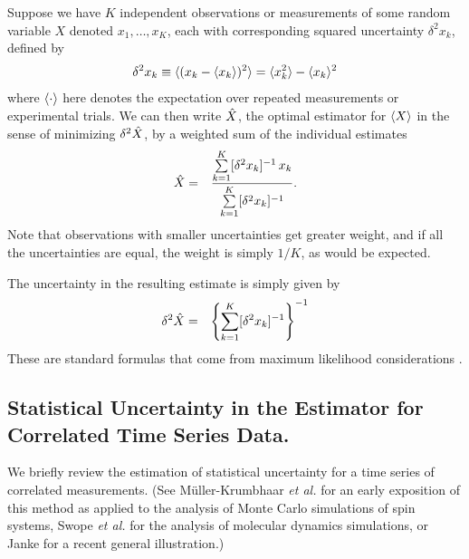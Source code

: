 Suppose we have $K$ independent observations or measurements of some random variable $X$ denoted $x_1,\ldots,x_K$, each with corresponding squared uncertainty $\delta^2 x_k$, defined by
\begin{eqnarray}
\delta^2 x_k \equiv \langle (x_k - \langle x_k \rangle)^2 \rangle = \langle x_k^2 \rangle - \langle x_k \rangle^2 
\end{eqnarray}
where $\langle \cdot \rangle$ here denotes the expectation over repeated measurements or experimental trials.  We can then write $\hat{X}$, the optimal estimator for $\langle X \rangle$ in the sense of minimizing $\delta^2 \hat{X}$, by a weighted sum of the individual estimates
\begin{eqnarray}
\hat{X} &=& \frac{\sum\limits_{k=1}^{K} [\delta^2 x_k]^{-1} \, x_k}{\sum\limits_{k=1}^{K} [\delta^2 x_k]^{-1}} . \label{wham:equation:combining-estimates}
\end{eqnarray}
Note that observations with smaller uncertainties get greater weight, and if all the uncertainties are equal, the weight is simply $1/K$, as would be expected.

The uncertainty in the resulting estimate is simply given by
\begin{eqnarray}
\delta^2 \hat{X} &=& \left\{ \sum_{k=1}^K [\delta^2 x_k]^{-1} \right\}^{-1} \label{wham:equation:combining-estimates-uncertainty}
\end{eqnarray}
These are standard formulas that come from maximum likelihood considerations \cite{cowan:statistical-data-analysis}.

\subsection{Statistical Uncertainty in the Estimator for Correlated Time Series Data.}
\label{wham:section:autocorrelation-error}

We briefly review the estimation of statistical uncertainty for a time series of correlated measurements.  (See M\"{u}ller-Krumbhaar \emph{et al.} \cite{mueller-krumbhaar:1973a} for an early exposition of this method as applied to the analysis of Monte Carlo simulations of spin systems, Swope \emph{et al.} \cite{swope:1982a} for the analysis of molecular dynamics simulations, or Janke \cite{janke:2002a} for a recent general illustration.)

